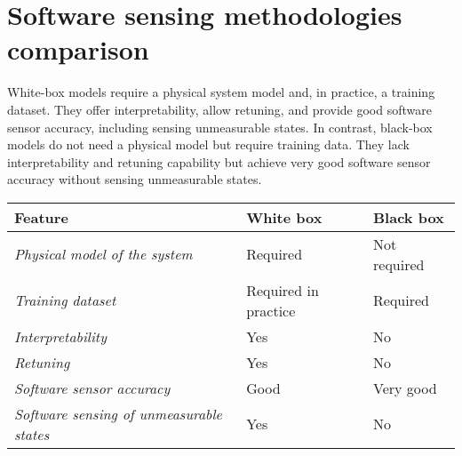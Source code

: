 \section{Software sensing methodologies comparison}

White-box models require a physical system model and, in practice, a training dataset. 
They offer interpretability, allow retuning, and provide good software sensor accuracy, including sensing unmeasurable states. 
In contrast, black-box models do not need a physical model but require training data. 
They lack interpretability and retuning capability but achieve very good software sensor accuracy without sensing unmeasurable states.
\renewcommand*{\arraystretch}{2}
\begin{table}[H]
    \centering
    \begin{tabular}{l|l|l|}
    \hline
    \multicolumn{1}{|l|}{\textbf{Feature}}                                                       & \textbf{White box}                       & \textbf{Black box} \\ \hline
    \multicolumn{1}{|l|}{\textit{Physical model of the system}}            & Required                                   & Not required       \\
    \multicolumn{1}{|l|}{\textit{Training dataset}}                        & Required in practice                       & Required           \\
    \multicolumn{1}{|l|}{\textit{Interpretability}}                        & Yes                                        & No                 \\
    \multicolumn{1}{|l|}{\textit{Retuning}}                                & Yes                                        & No                 \\
    \multicolumn{1}{|l|}{\textit{Software sensor accuracy}}                & Good                                       & Very good          \\
    \multicolumn{1}{|l|}{\textit{Software sensing of unmeasurable states}} & Yes                                        & No                 \\ \hline
    \end{tabular}
\end{table}
\renewcommand*{\arraystretch}{1}